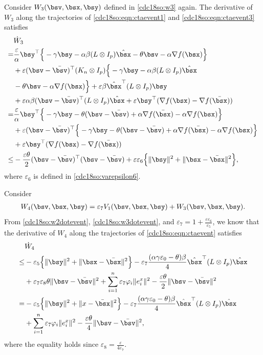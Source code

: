 \documentclass[letterpaper, 10 pt, conference]{ieeeconf}  %
\begin{document}
Consider $W_3(\bsv,\bsx,\bsy)$ defined in \eqref{cdc18so:w3} again.
The derivative of $W_3$ along the trajectories of \eqref{cdc18so:eqn:ctaevent1} and \eqref{cdc18so:eqn:ctaevent3} satisfies
\begin{align}\label{cdc18so:w3dotevent}
&\dot{W}_3\nonumber\\
=&\frac{\varepsilon}{\alpha}\bsy^\top\Big\{-\gamma \bsy-\alpha\beta(L\otimes I_p)\hat{\bsx}- \theta \bsv- \alpha \nabla f(\bsx)\Big\}\nonumber\\
&+\varepsilon(\bsv-\bar{\bsv})^\top (K_n \otimes I_p) \Big\{- \gamma \bsy-\alpha\beta (L \otimes I_p)\hat{\bsx}\nonumber\\
&- \theta \bsv- \alpha \nabla f(\bsx)\Big\}+\varepsilon \beta \hat{\bsx}^\top(L \otimes I_p)\bsy\nonumber\\
&+\varepsilon\alpha\beta(\bsv-\bar{\bsv})^\top (L \otimes I_p)\hat{\bsx}+\varepsilon \bsy^\top(\nabla f(\bsx)-\nabla  f(\bar{\bsx}))\nonumber\\
=&\frac{\varepsilon}{\alpha}\bsy^\top\Big\{-\gamma \bsy- \theta (\bsv-\bar{\bsv})+\alpha \nabla f(\bar{\bsx})- \alpha \nabla f(\bsx)\Big\}\nonumber\\
&+\varepsilon(\bsv-\bar{\bsv})^\top \Big\{- \gamma \bsy-\theta (\bsv-\bar{\bsv})+\alpha \nabla f(\bar{\bsx})- \alpha \nabla f(\bsx)\Big\}\nonumber\\
&+\varepsilon \bsy^\top(\nabla f(\bsx)-\nabla  f(\bar{\bsx}))\nonumber\\
\le&-\frac{\varepsilon\theta }{2}(\bsv-\bar{\bsv})^\top(\bsv-\bar{\bsv})+\varepsilon\varepsilon_6\Big\{\|\bsy\|^2+\|\bsx-\bar{\bsx}\|^2\Big\},
\end{align}
where $\varepsilon_6$ is defined in \eqref{cdc18so:varepsilon6}.


Consider
\begin{align*}
W_4(\bsv,\bsx,\bsy)=\varepsilon_7V_1(\bsv,\bsx,\bsy)+W_3(\bsv,\bsx,\bsy).
\end{align*}
From \eqref{cdc18so:w2dotevent}, \eqref{cdc18so:w3dotevent}, and $\varepsilon_7=1+\frac{\varepsilon\varepsilon_6}{\varepsilon_5}$, we know that the derivative of $W_4$ along the trajectories of \eqref{cdc18so:eqn:ctaevent} satisfies
\begin{align}\label{cdc18so:w4dotevent}
&\dot{W}_4\nonumber\\
\le&-\varepsilon_5\Big\{\|\bsy\|^2+\|\bsx-\bar{\bsx}\|^2\Big\}
-\varepsilon_7\frac{(\alpha\gamma\varepsilon_0-\theta)\beta}{4}\hat{\bsx}^\top (L \otimes I_p)\hat{\bsx}\nonumber\\
&+\varepsilon_7\varepsilon_8\theta \|\bsv-\bar{\bsv}\|^2+\sum_{i=1}^{n}\varepsilon_7\varphi_i\|e^{x}_i\|^2
-\frac{\varepsilon\theta}{2}\|\bsv-\bar{\bsv}\|^2\nonumber\\
=&-\varepsilon_5\Big\{\|\bsy\|^2+\|x-\bar{\bsx}\|^2\Big\}
-\varepsilon_7\frac{(\alpha\gamma\varepsilon_0-\theta)\beta}{4}\hat{\bsx}^\top (L \otimes I_p)\hat{\bsx}\nonumber\\
&+\sum_{i=1}^{n}\varepsilon_7\varphi_i\|e^{x}_i\|^2
-\frac{\varepsilon\theta}{4}\|\bsv-\bar{\bsv}\|^2,
\end{align}
where  the equality holds since $\varepsilon_8=\frac{\varepsilon}{4\varepsilon_7}$.
\end{document}
